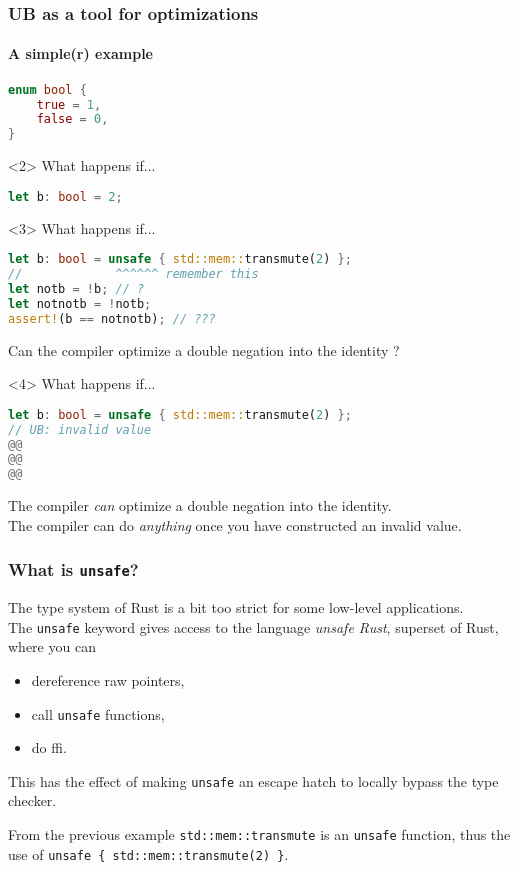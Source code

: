 \begin{frame}[fragile,t]
    \frametitle{UB as a tool for optimizations}
    \framesubtitle{A simple(r) example}

    \begin{lstlisting}[language=rust]
enum bool {
    true = 1,
    false = 0,
}
    \end{lstlisting}

    \begin{onlyenv}<2>
        What happens if...
        \begin{lstlisting}[language=rust]
let b: bool = 2;
        \end{lstlisting}
    \end{onlyenv}

    \begin{onlyenv}<3>
        What happens if...
        \begin{lstlisting}[language=rust]
let b: bool = unsafe { std::mem::transmute(2) };
//             ^^^^^^ remember this
let notb = !b; // ?
let notnotb = !notb;
assert!(b == notnotb); // ???
        \end{lstlisting}
        Can the compiler optimize a double negation into the identity ?
    \end{onlyenv}

    \begin{onlyenv}<4>
        What happens if...
        \begin{lstlisting}[language=rust, escapechar=@]
let b: bool = unsafe { std::mem::transmute(2) };
// UB: invalid value
@@
@@
@@
        \end{lstlisting}
        The compiler \textit{can} optimize a double negation into the identity.\\
        The compiler can do \textit{anything} once you have constructed an invalid value.
    \end{onlyenv}
\end{frame}

\begin{frame}[fragile,t]
    \frametitle{What is \texttt{unsafe}?}
    The type system of Rust is a bit too strict for some low-level applications.\\
    The \texttt{unsafe} keyword gives access to the language \textit{unsafe Rust},
    superset of Rust, where you can
    \begin{itemize}
        \item dereference raw pointers,
        \item call \texttt{unsafe} functions,
        \item do ffi.
    \end{itemize}

    This has the effect of making \texttt{unsafe} an escape hatch to locally bypass the type checker.
    \begin{exampleblock}{From the previous example}
        \texttt{std::mem::transmute} is an \texttt{unsafe} function, thus the
        use of \texttt{unsafe \{ std::mem::transmute(2) \}}.
    \end{exampleblock}
\end{frame}


